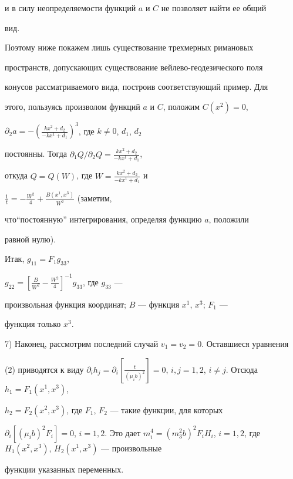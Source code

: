 и в силу неопределяемости функций $a$ и $C$ не позволяет найти ее общий 


вид. 


 


Поэтому ниже покажем лишь существование трехмерных римановых 


пространств, допускающих существование вейлево-геодезического поля 


конусов рассматриваемого вида, построив соответствующий пример. Для 


этого, пользуясь произволом функций $a$ и $C$, положим $C(x^2)=0$, 


$\partial_2a=-(\frac{kx^2+d_2}{-kx^1+d_1})^3$, где $k\ne0$, $d_1$, $d_2$ 


постоянны. Тогда $\partial_1Q/\partial_2Q= \frac{kx^2+d_2}{-kx^1+d_1}$, 


откуда $Q=Q(W)$, где $W=\frac{kx^2+d_2}{-kx^1+d_1}$ и 


$\frac{1}{t}=-\frac{W^2}{4}+\frac{B(x^1,x^3)}{W^2}$ (заметим, 


что``постоянную'' интегрирования, определяя функцию $a$,  положили 


равной нулю). 


 


Итак, $g_{11}=F_1g_{33}$, 


$g_{22}=[\frac{B}{W^2}-\frac{W^2}{4}]^{-1}g_{33}$, где $g_{33}$ --- 


произвольная функция координат; $B$ --- функция $x^1$, $x^3$; $F_1$ --- 


функция только $x^3$. 


 


7) Наконец, рассмотрим последний случай $v_1=v_2=0$. Оставшиеся уравнения 


(2) приводятся к виду $\partial_i h_j=\partial_i[\frac{t}{(\mu_i 


b)^2}]=0$, $i,j=1,2$, $i\ne j$. Отсюда $h_1=F_1(x^1,x^3)$, 


$h_2=F_2(x^2,x^3)$, где $F_1$, $F_2$ --- такие функции, для которых 


$\partial_i[(\mu_i b)^2F_i]=0$, $i=1,2$. Это дает $m^4_i=(m^2_3b)^2F_i 


H_i$, $i=1,2$, где $H_1(x^2,x^3)$, $H_2(x^1,x^3)$ --- произвольные 


функции указанных переменных. 


 


